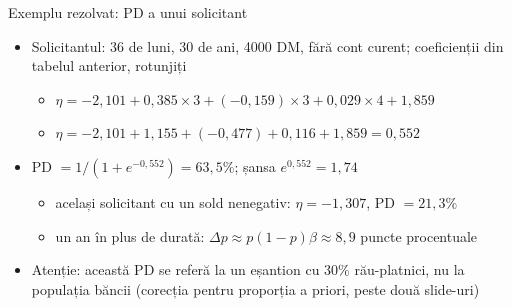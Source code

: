 \begin{frame}{Exemplu rezolvat: PD a unui solicitant}
\itemsize{\small}
\begin{itemize}
    \item Solicitantul: 36 de luni, 30 de ani, 4000 DM, fără cont curent; coeficienții din tabelul anterior, rotunjiți
    \begin{itemize}
        \item $\eta = -2{,}101 + 0{,}385 \times 3 + (-0{,}159) \times 3 + 0{,}029 \times 4 + 1{,}859$
        \item $\eta = -2{,}101 + 1{,}155 + (-0{,}477) + 0{,}116 + 1{,}859 = 0{,}552$
    \end{itemize}
    \item PD $= 1/(1 + e^{-0{,}552}) = 63{,}5\%$; șansa $e^{0{,}552} = 1{,}74$
    \begin{itemize}
        \item același solicitant cu un sold nenegativ: $\eta = -1{,}307$, PD $= 21{,}3\%$
        \item un an în plus de durată: $\Delta p \approx p(1 - p)\beta \approx 8{,}9$ puncte procentuale
    \end{itemize}
    \item Atenție: această PD se referă la un eșantion cu 30\% rău-platnici, nu la populația băncii (corecția pentru proporția a priori, peste două slide-uri)
\end{itemize}
\end{frame}

